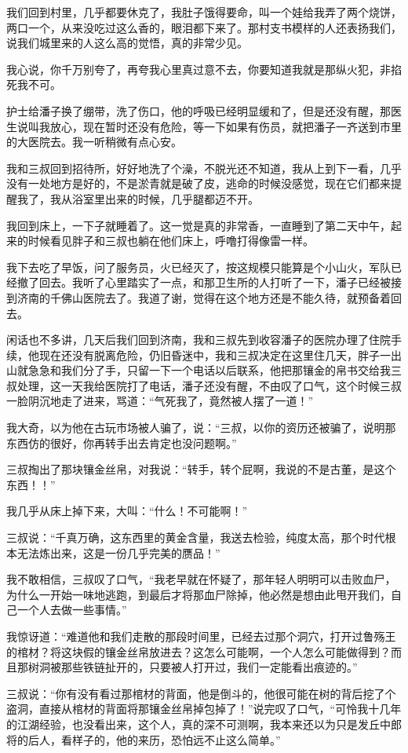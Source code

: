 我们回到村里，几乎都要休克了，我肚子饿得要命，叫一个娃给我弄了两个烧饼，两口一个，从来没吃过这么香的，眼泪都下来了。那村支书模样的人还表扬我们，说我们城里来的人这么高的觉悟，真的非常少见。

我心说，你千万别夸了，再夸我心里真过意不去，你要知道我就是那纵火犯，非掐死我不可。

护士给潘子换了绷带，洗了伤口，他的呼吸已经明显缓和了，但是还没有醒，那医生说叫我放心，现在暂时还没有危险，等一下如果有伤员，就把潘子一齐送到市里的大医院去。我一听稍微有点心安。

我和三叔回到招待所，好好地洗了个澡，不脱光还不知道，我从上到下一看，几乎没有一处地方是好的，不是淤青就是破了皮，逃命的时候没感觉，现在它们都来提醒我了，我从浴室里出来的时候，几乎腿都迈不开。

我回到床上，一下子就睡着了。这一觉是真的非常香，一直睡到了第二天中午，起来的时候看见胖子和三叔也躺在他们床上，呼噜打得像雷一样。

我下去吃了早饭，问了服务员，火已经灭了，按这规模只能算是个小山火，军队已经撤了回去。我听了心里踏实了一点，和那卫生所的人打听了一下，潘子已经被接到济南的千佛山医院去了。我道了谢，觉得在这个地方还是不能久待，就预备着回去。

闲话也不多讲，几天后我们回到济南，我和三叔先到收容潘子的医院办理了住院手续，他现在还没有脱离危险，仍旧昏迷中，我和三叔决定在这里住几天，胖子一出山就急急和我们分了手，只留一下一个电话以后联系，他把那镶金的帛书交给我三叔处理，这一天我给医院打了电话，潘子还没有醒，不由叹了口气，这个时候三叔一脸阴沉地走了进来，骂道：“气死我了，竟然被人摆了一道！”

我大奇，以为他在古玩市场被人骗了，说：“三叔，以你的资历还被骗了，说明那东西仿的很好，你再转手出去肯定也没问题啊。”

三叔掏出了那块镶金丝帛，对我说：“转手，转个屁啊，我说的不是古董，是这个东西！！”

我几乎从床上掉下来，大叫：“什么！不可能啊！”

三叔说：“千真万确，这东西里的黄金含量，我送去检验，纯度太高，那个时代根本无法炼出来，这是一份几乎完美的赝品！”

我不敢相信，三叔叹了口气，“我老早就在怀疑了，那年轻人明明可以击败血尸，为什么一开始一味地逃跑，到最后才将那血尸除掉，他必然是想由此甩开我们，自己一个人去做一些事情。”

我惊讶道：“难道他和我们走散的那段时间里，已经去过那个洞穴，打开过鲁殇王的棺材？将这块假的镶金丝帛放进去？这怎么可能啊，一个人怎么可能做得到？而且那树洞被那些铁链扯开的，只要被人打开过，我们一定能看出痕迹的。”

三叔说：“你有没有看过那棺材的背面，他是倒斗的，他很可能在树的背后挖了个盗洞，直接从棺材的背面将那镶金丝帛掉包掉了！”说完叹了口气，“可怜我十几年的江湖经验，也没看出来，这个人，真的深不可测啊，我本来还以为只是发丘中郎将的后人，看样子的，他的来历，恐怕远不止这么简单。”

